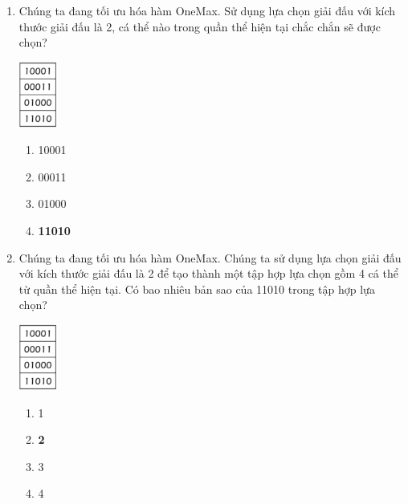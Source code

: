 \documentclass{book}
\begin{document}
\begin{enumerate}
    \item Chúng ta đang tối ưu hóa hàm OneMax. Sử dụng lựa chọn giải đấu với kích thước giải đấu là 2, cá thể nào trong quần thể hiện tại chắc chắn sẽ được chọn?
    \begin{center}
        \includegraphics[width=0.1\textwidth]{images/quiz2.png}
    \end{center}
    \begin{multicols}{2}
        \begin{enumerate}[label=\Alph*]
            \item 10001
            \item 00011
            \item 01000
            \item \textbf{11010}
        \end{enumerate}
    \end{multicols}

    \item Chúng ta đang tối ưu hóa hàm OneMax. Chúng ta sử dụng lựa chọn giải đấu với kích thước giải đấu là 2 để tạo thành một tập hợp lựa chọn gồm 4 cá thể từ quần thể hiện tại. Có bao nhiêu bản sao của 11010 trong tập hợp lựa chọn?
    \begin{center}
        \includegraphics[width=0.1\textwidth]{images/quiz2.png}
    \end{center}
    \begin{multicols}{2}
        \begin{enumerate}[label=\Alph*]
            \item 1
            \item \textbf{2}
            \item 3
            \item 4
        \end{enumerate}
    \end{multicols}


\end{enumerate}
\end{document}
